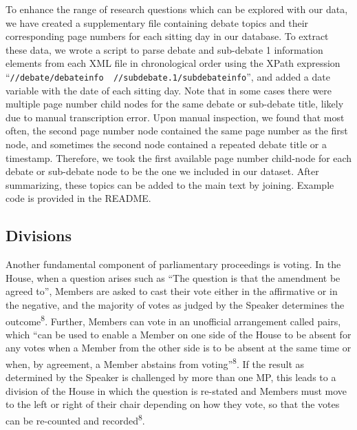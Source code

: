 \documentclass[
  letterpaper,
  DIV=11,
  numbers=noendperiod]{scrartcl}
\begin{document}
To enhance the range of research questions which can be explored with
our data, we have created a supplementary file containing debate topics
and their corresponding page numbers for each sitting day in our
database. To extract these data, we wrote a script to parse debate and
sub-debate 1 information elements from each XML file in chronological
order using the XPath expression
``\texttt{//debate/debateinfo\ \textbar{}\ //subdebate.1/subdebateinfo}'',
and added a date variable with the date of each sitting day. Note that
in some cases there were multiple page number child nodes for the same
debate or sub-debate title, likely due to manual transcription error.
Upon manual inspection, we found that most often, the second page number
node contained the same page number as the first node, and sometimes the
second node contained a repeated debate title or a timestamp. Therefore,
we took the first available page number child-node for each debate or
sub-debate node to be the one we included in our dataset. After
summarizing, these topics can be added to the main text by joining.
Example code is provided in the README.

\hypertarget{divisions}{%
\subsection{Divisions}\label{divisions}}

Another fundamental component of parliamentary proceedings is voting. In
the House, when a question arises such as ``The question is that the
amendment be agreed to'', Members are asked to cast their vote either in
the affirmative or in the negative, and the majority of votes as judged
by the Speaker determines the outcome\textsuperscript{8}. Further,
Members can vote in an unofficial arrangement called pairs, which ``can
be used to enable a Member on one side of the House to be absent for any
votes when a Member from the other side is to be absent at the same time
or when, by agreement, a Member abstains from
voting''\textsuperscript{8}. If the result as determined by the Speaker
is challenged by more than one MP, this leads to a division of the House
in which the question is re-stated and Members must move to the left or
right of their chair depending on how they vote, so that the votes can
be re-counted and recorded\textsuperscript{8}.
\end{document}
